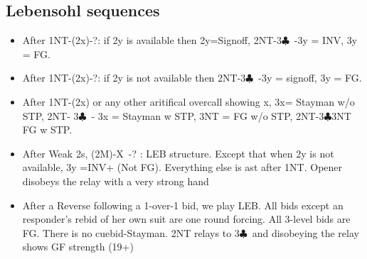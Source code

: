 \documentclass{article}
\newcommand\C{\ensuremath{\clubsuit}}
\newcommand\X{{\footnotesize X}}
\begin{document}
\begin{multicols}{2}
  \subsection{Lebensohl sequences }
  \label{leb}
  \begin{itemize}
    \item After 1NT-(2x)-?: if 2y is available then 2y=Signoff, 2NT-3\C\ -3y = INV, 3y = FG.
    \item After 1NT-(2x)-?: if 2y is not available then  2NT-3\C\ -3y = signoff, 3y = FG.
    \item After 1NT-(2x) or any other aritifical overcall showing x, 3x= Stayman w/o STP, 2NT- 3\C\ - 3x = Stayman w STP, 3NT = FG w/o STP, 2NT-3\C\-3NT FG w STP.
    \item After Weak 2s, (2M)-\X\ -? : LEB structure. Except that when 2y is not available, 3y =INV+ (Not FG). Everything else is ast after 1NT. Opener disobeys the relay with a very strong hand
    \item After a Reverse following a 1-over-1 bid, we play LEB. All bids except an responder's rebid of her own suit are one round forcing. All 3-level bids are FG. There is no cuebid-Stayman. 2NT relays to 3\C\ and disobeying the relay shows GF strength (19+)
\end{itemize}
  


\end{multicols}
\end{document}
